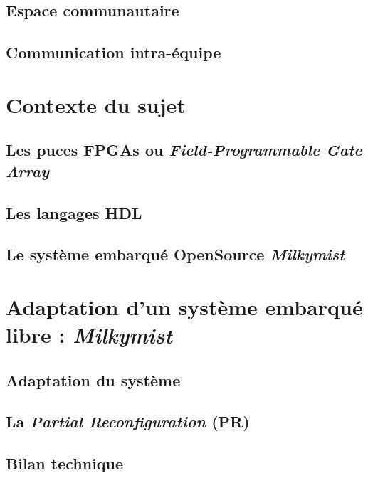 \documentclass[a4paper]{report}
\newcommand{\english}[1]{\textit{#1}}
\newcommand{\fpgas} {FPGAs}
\begin{document}
\section{Espace communautaire}


\section{Communication intra-équipe}


\newpage

\chapter{Contexte du sujet}
\section{Les puces \fpgas{} ou \english{Field-Programmable Gate Array}}


\section{Les langages HDL}


\section{Le système embarqué OpenSource \textit{Milkymist}}


\newpage



\chapter{Adaptation d'un système embarqué libre : \textit{Milkymist}}

\section{Adaptation du système}


\section{La \english{Partial Reconfiguration} (PR)}


\section{Bilan technique}

\end{document}
